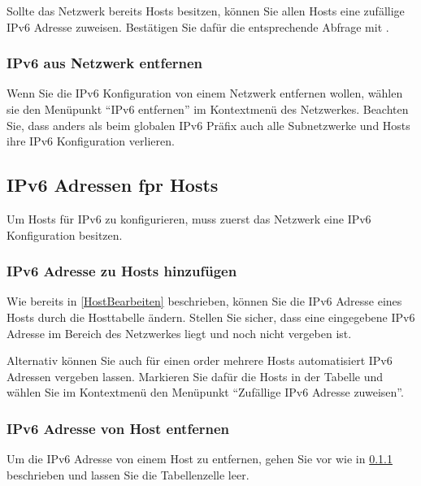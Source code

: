 Sollte das Netzwerk bereits Hosts besitzen, können Sie allen Hosts eine zufällige
IPv6 Adresse zuweisen. Bestätigen Sie dafür die entsprechende Abfrage mit .

\subsubsection{IPv6 aus Netzwerk entfernen}
Wenn Sie die IPv6 Konfiguration von einem Netzwerk entfernen wollen,
wählen sie den Menüpunkt "`IPv6 entfernen"' im Kontextmenü des Netzwerkes.
Beachten Sie, dass anders als beim globalen IPv6 Präfix auch alle Subnetzwerke
und Hosts ihre IPv6 Konfiguration verlieren.

\subsection{IPv6 Adressen fpr Hosts}
Um Hosts für IPv6 zu konfigurieren, muss zuerst das Netzwerk eine IPv6 Konfiguration besitzen.

\subsubsection{IPv6 Adresse zu Hosts hinzufügen}
\label{HostIPv6Hinzufuegen}
Wie bereits in \ref{HostBearbeiten} beschrieben, können Sie die IPv6 Adresse eines Hosts
durch die Hosttabelle ändern.
Stellen Sie sicher, dass eine eingegebene IPv6 Adresse im Bereich des Netzwerkes liegt und
noch nicht vergeben ist.

Alternativ können Sie auch für einen order mehrere Hosts automatisiert IPv6 Adressen
vergeben lassen. Markieren Sie dafür die Hosts in der Tabelle und wählen Sie im Kontextmenü
den Menüpunkt "`Zufällige IPv6 Adresse zuweisen"'.

\subsubsection{IPv6 Adresse von Host entfernen}
Um die IPv6 Adresse von einem Host zu entfernen, gehen Sie vor wie in
\ref{HostIPv6Hinzufuegen} beschrieben und lassen Sie die Tabellenzelle leer.